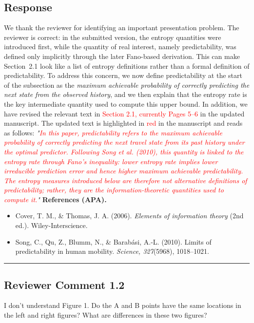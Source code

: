 \documentclass{NSF}
\begin{document}
\subsection{Response}
We thank the reviewer for identifying an important presentation problem. The reviewer is correct: in the submitted version, the entropy quantities were introduced first, while the quantity of real interest, namely predictability, was defined only implicitly through the later Fano-based derivation. This can make Section~2.1 look like a list of entropy definitions rather than a formal definition of predictability. To address this concern, we now define predictability at the start of the subsection as the \emph{maximum achievable probability of correctly predicting the next state from the observed history}, and we then explain that the entropy rate is the key intermediate quantity used to compute this upper bound.
\noindent In addition, we have revised the relevant text in \textcolor{red}{Section 2.1, currently Pages 5--6} in the updated manuscript. The updated text is highlighted in \textcolor{red}{red} in the manuscript and reads as follows:
\vskip 0.1cm
\noindent \textit{"\textcolor{red}{In this paper, \emph{predictability} refers to the maximum achievable probability of correctly predicting the next travel state from its past history under the optimal predictor. Following Song et al. (2010), this quantity is linked to the entropy rate through Fano's inequality: lower entropy rate implies lower irreducible prediction error and hence higher maximum achievable predictability. The entropy measures introduced below are therefore not alternative definitions of predictability; rather, they are the information-theoretic quantities used to compute it.}"}
\vskip 0.05in
\noindent\textbf{References (APA).}
\begin{itemize}
    \item Cover, T. M., \& Thomas, J. A. (2006). \textit{Elements of information theory} (2nd ed.). Wiley-Interscience.
    \item Song, C., Qu, Z., Blumm, N., \& Barab\'asi, A.-L. (2010). Limits of predictability in human mobility. \textit{Science, 327}(5968), 1018--1021.
\end{itemize}

\noindent\rule{16.5cm}{1.0pt}

\subsection{Reviewer Comment 1.2}
\begin{mdframed}
I don't understand Figure 1. Do the A and B points have the same locations in the left and right figures? What are differences in these two figures?
\end{mdframed}
\end{document}
